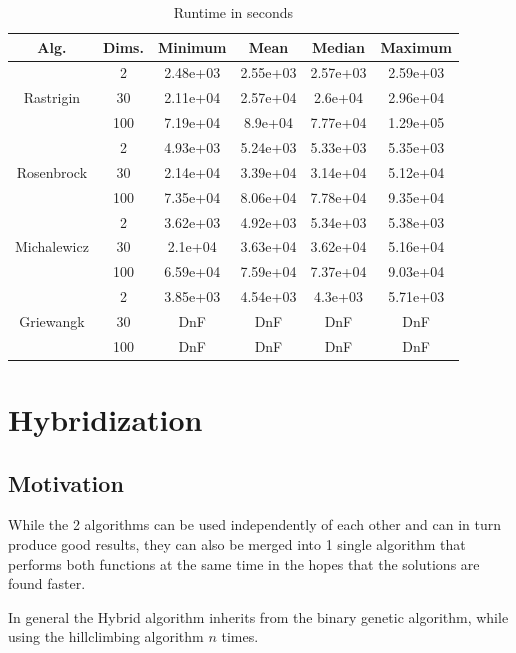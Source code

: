 \documentclass[conference]{IEEEtran}
\begin{document}
\begin{table}[!htbp]
    \caption{Runtime in seconds}
    \centering
    \begin{tabular}{|c c|c c c c|}
        \hline
        Alg. & Dims. & Minimum & Mean & Median & Maximum \\
        \hline
        \multirow{3}{*}{Rastrigin} & 2 & 2.48e+03 & 2.55e+03 & 2.57e+03 & 2.59e+03 \\
        & 30 & 2.11e+04 & 2.57e+04 & 2.6e+04 & 2.96e+04 \\
        & 100 & 7.19e+04 & 8.9e+04 & 7.77e+04 & 1.29e+05 \\
        \hline
        \multirow{3}{*}{Rosenbrock} & 2 & 4.93e+03 & 5.24e+03 & 5.33e+03 & 5.35e+03 \\
        & 30 & 2.14e+04 & 3.39e+04 & 3.14e+04 & 5.12e+04 \\
        & 100 & 7.35e+04 & 8.06e+04 & 7.78e+04 & 9.35e+04 \\
        \hline
        \multirow{3}{*}{Michalewicz} & 2 & 3.62e+03 & 4.92e+03 & 5.34e+03 & 5.38e+03 \\
        & 30 & 2.1e+04 & 3.63e+04 & 3.62e+04 & 5.16e+04 \\
        & 100 & 6.59e+04 & 7.59e+04 & 7.37e+04 & 9.03e+04 \\
        \hline
        \multirow{3}{*}{Griewangk} & 2 & 3.85e+03 & 4.54e+03 & 4.3e+03 & 5.71e+03 \\
        & 30 & DnF & DnF & DnF & DnF \\
        & 100 & DnF & DnF & DnF & DnF \\
        \hline
    \end{tabular}
\end{table}

\section{Hybridization}

\subsection{Motivation}
While the 2 algorithms can be used independently of each other and can in turn produce good results, they can also be
merged into 1 single algorithm that performs both functions at the same time in the hopes that the solutions are found faster.

In general the Hybrid algorithm inherits from the binary genetic algorithm, while using the hillclimbing algorithm
$n$ times.
\end{document}
